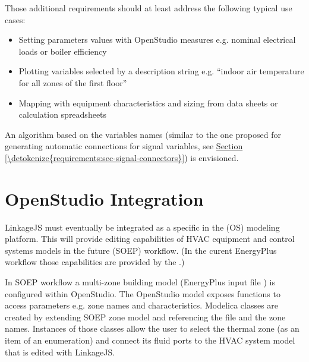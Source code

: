 \documentclass[letterpaper,10pt, openany,english]{sphinxmanual}
\begin{document}
Those additional requirements should at least address the following typical use cases:
\begin{itemize}
\item {} 
Setting parameters values with OpenStudio measures e.g. nominal electrical loads or boiler efficiency

\item {} 
Plotting variables selected by a description string e.g. “indoor air temperature for all zones of the first floor”

\item {} 
Mapping with equipment characteristics and sizing from data sheets or calculation spreadsheets

\end{itemize}

An algorithm based on the variables names (similar to the one proposed for generating automatic connections for signal variables, see \hyperref[\detokenize{requirements:sec-signal-connectors}]{Section \ref{\detokenize{requirements:sec-signal-connectors}}}) is envisioned.


\section{OpenStudio Integration}
\label{\detokenize{requirements:openstudio-integration}}
LinkageJS must eventually be integrated as a specific  in the  (OS) modeling platform. This will provide editing capabilities of HVAC equipment and control systems models in the future  (SOEP) workflow. (In the curent EnergyPlus workflow those capabilities are provided by the .)

In SOEP workflow a multi-zone building model (EnergyPlus input file ) is configured within OpenStudio. The OpenStudio model  exposes functions to access  parameters e.g. zone names and characteristics. Modelica classes are created by extending SOEP zone model and referencing the  file and the zone names. Instances of those classes allow the user to select the thermal zone (as an item of an enumeration) and connect its fluid ports to the HVAC system model that is edited with LinkageJS.
\end{document}
